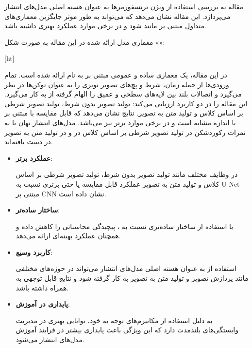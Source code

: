 
\label{بررسی و مقایسه مقالات}


مقاله  به بررسی استفاده از ویژن ترنسفورمرها به عنوان هسته اصلی مدل‌های انتشار می‌پردازد. این مقاله نشان می‌دهد که  می‌تواند به طور موثر جایگزین معماری‌های متداول مبتنی بر  مانند  شود و در برخی موارد عملکرد بهتری داشته باشد.


معماری مدل ارائه شده در این مقاله به صورت شکل «»:

[ht]



در این مقاله، یک معماری ساده و عمومی مبتنی بر  به نام  ارائه شده است.  تمام ورودی‌ها از جمله زمان، شرط و پچ‌های تصویر نویزی را به عنوان توکن‌ها در نظر می‌گیرد و اتصالات بلند بین لایه‌های سطحی و عمیق را الهام گرفته از  به کار می‌گیرد. این مقاله را در دو کاربرد ارزیابی می‌کند: تولید تصویر بدون شرط، تولید تصویر شرطی بر اساس کلاس و تولید متن به تصویر. نتایج نشان می‌دهد که  قابل مقایسه با  مبتنی بر  با اندازه مشابه است و در برخی موارد برتر نیز می‌باشد. مدل‌های انتشار نهان با  به نمرات  رکوردشکن  در تولید تصویر شرطی بر اساس کلاس در  و  در تولید متن به تصویر در  دست یافته‌اند.



\begin{itemize}
	\item \textbf{عملکرد برتر}:
	
	 در وظایف مختلف مانند تولید تصویر بدون شرط، تولید تصویر شرطی بر اساس کلاس و تولید متن به تصویر عملکرد قابل مقایسه یا حتی برتری نسبت به U-Net مبتنی بر CNN نشان داده است.
	
	\item \textbf{ساختار ساده‌تر}:
	
	  با استفاده از ساختار ساده‌تری نسبت به ، پیچیدگی محاسباتی را کاهش داده و همچنان عملکرد بهینه‌ای ارائه می‌دهد.
	 
	\item \textbf{کاربرد وسیع}:
	
	 استفاده از  به عنوان هسته اصلی مدل‌های انتشار می‌تواند در حوزه‌های مختلفی مانند پردازش تصویر و تولید متن به تصویر به کار گرفته شود و نتایج قابل توجهی به همراه داشته باشد.
	 
	\item \textbf{پایداری در آموزش}:
	
	  به دلیل استفاده از مکانیزم‌های توجه به خود، توانایی بهتری در مدیریت وابستگی‌های بلندمدت دارد که این ویژگی باعث پایداری بیشتر در فرایند آموزش مدل‌های انتشار می‌شود.
\end{itemize}








